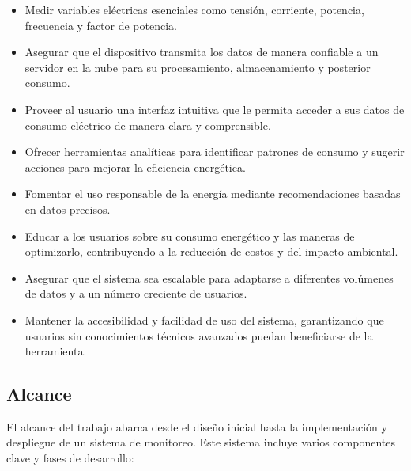 \begin{itemize}
	\item Medir variables eléctricas esenciales como tensión, corriente, potencia, frecuencia y factor de potencia.
	
	\item Asegurar que el dispositivo transmita los datos de manera confiable a un servidor en la nube para su procesamiento, almacenamiento y posterior consumo.

	\item  Proveer al usuario una interfaz intuitiva que le permita acceder a sus datos de consumo eléctrico de manera clara y comprensible.

	\item Ofrecer herramientas analíticas para identificar patrones de consumo y sugerir acciones para mejorar la eficiencia energética. 
	
	\item Fomentar el uso responsable de la energía mediante recomendaciones basadas en datos precisos.
	
	\item Educar a los usuarios sobre su consumo energético y las maneras de optimizarlo, contribuyendo a la reducción de costos y del impacto ambiental.
	
	\item Asegurar que el sistema sea escalable para adaptarse a diferentes volúmenes de datos y a un número creciente de usuarios.
	
	\item Mantener la accesibilidad y facilidad de uso del sistema, garantizando que usuarios sin conocimientos técnicos avanzados puedan beneficiarse de la herramienta.
\end{itemize}

\subsection{Alcance}

El alcance del trabajo abarca desde el diseño inicial hasta la implementación y despliegue de un sistema de monitoreo. Este sistema incluye varios componentes clave y fases de desarrollo:

